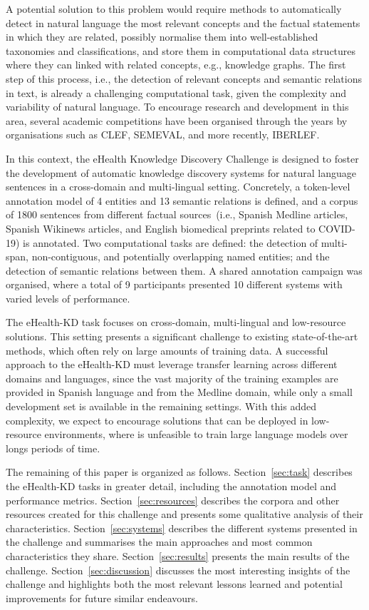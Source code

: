 \documentclass[a4paper,11pt,twocolumn,twoside]{article}
\begin{document}
A potential solution to this problem would require methods to automatically detect in natural language the most relevant concepts and the factual statements in which they are related, possibly normalise them into well-established taxonomies and classifications, and store them in computational data structures where they can linked with related concepts, e.g., knowledge graphs.
The first step of this process, i.e., the detection of relevant concepts and semantic relations in text, is already a challenging computational task, given the complexity and variability of natural language.
To encourage research and development in this area, several academic competitions have been organised through the years by organisations such as CLEF, SEMEVAL, and more recently, IBERLEF.

In this context, the eHealth Knowledge Discovery Challenge is designed to foster the development of automatic knowledge discovery systems for natural language sentences in a cross-domain and multi-lingual setting.
Concretely, a token-level annotation model of 4 entities and 13 semantic relations is defined, and a corpus of 1800 sentences from different factual sources~(i.e., Spanish Medline articles, Spanish Wikinews articles, and English biomedical preprints related to COVID-19) is annotated.
Two computational tasks are defined: the detection of multi-span, non-contiguous, and potentially overlapping named entities; and the detection of semantic relations between them.
A shared annotation campaign was organised, where a total of 9 participants presented 10 different systems with varied levels of performance.

The eHealth-KD task focuses on cross-domain, multi-lingual and low-resource solutions. This setting presents a significant challenge to existing state-of-the-art methods, which often rely on large amounts of training data.
A successful approach to the eHealth-KD must leverage transfer learning across different domains and languages, since the vast majority of the training examples are provided in Spanish language and from the Medline domain, while only a small development set is available in the remaining settings.
With this added complexity, we expect to encourage solutions that can be deployed in low-resource environments, where is unfeasible to train large language models over longs periods of time.

The remaining of this paper is organized as follows.
Section~\ref{sec:task} describes the eHealth-KD tasks in greater detail, including the annotation model and performance metrics.
Section~\ref{sec:resources} describes the corpora and other resources created for this challenge and presents some qualitative analysis of their characteristics.
Section~\ref{sec:systems} describes the different systems presented in the challenge and summarises the main approaches and most common characteristics they share.
Section~\ref{sec:results} presents the main results of the challenge.
Section~\ref{sec:discussion} discusses the most interesting insights of the challenge and highlights both the most relevant lessons learned and potential improvements for future similar endeavours.
\end{document}
